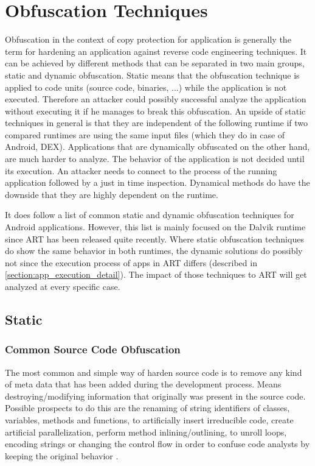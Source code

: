 \section{Obfuscation Techniques}\label{section:obfuscation_techniques}
Obfuscation in the context of copy protection for application
is generally the term for hardening an application against
reverse code engineering techniques. It can be achieved by different methods
that can be separated in two main groups, static and dynamic obfuscation.
Static means that the obfuscation technique is applied to code units (source
code, binaries, ...) while the application is not executed. Therefore an
attacker could possibly successful analyze the application without executing it
if he manages to break this obfuscation. An upside of static techniques in general is that they are independent of the following runtime if two compared runtimes are using the same input files (which they do in case of Android, DEX).
Applications that are dynamically obfuscated on the other hand, are much harder to analyze. The behavior
of the application is not decided until its execution. An attacker needs to connect to the process of the running application followed by a just in time inspection. Dynamical methods do have the downside that they are highly dependent on the runtime.

It does follow a list of common static and dynamic obfuscation techniques
for Android applications. However, this list is mainly focused on
the Dalvik runtime since ART has been released quite recently.
Where static obfuscation techniques do show the same behavior in both
runtimes, the dynamic solutions do possibly not since the execution process
of apps in ART differs (described in \autoref{section:app_execution_detail}).
The impact of those techniques to ART will get analyzed at every specific case.


\subsection{Static}
\subsubsection{Common Source Code Obfuscation}
The most common and simple way of harden source code is to remove any kind of meta data
that has been added during the development process. Means destroying/modifying
information that originally was present in the source code.
Possible prospects to do this are the renaming of string identifiers of
classes, variables, methods and functions, to artificially insert
irreducible code, create artificial parallelization, perform method inlining/outlining, to unroll loops, encoding strings or changing the control flow in
order to confuse code analysts by keeping the original behavior
\parencite{lvl_imp}.

